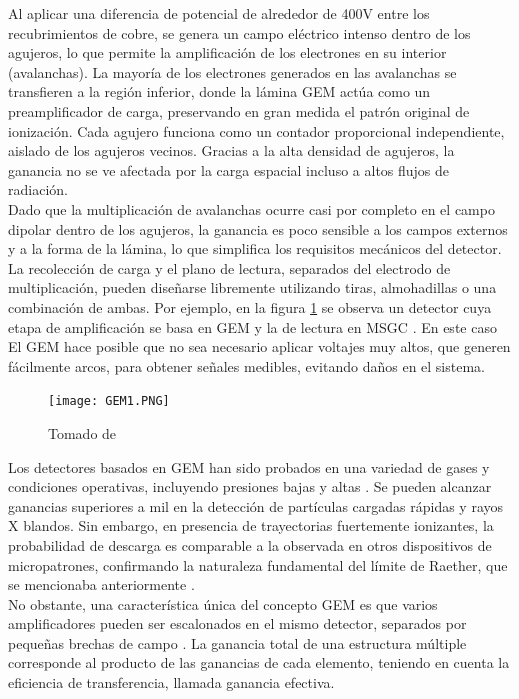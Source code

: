 \documentclass{article}
\begin{document}
\noindent Al aplicar una diferencia de potencial de alrededor de 400V entre los recubrimientos de cobre, se genera un campo eléctrico intenso dentro de los agujeros, lo que permite la amplificación de los electrones en su interior (avalanchas). La mayoría de los electrones generados en las avalanchas se transfieren a la región inferior, donde la lámina GEM actúa como un preamplificador de carga, preservando en gran medida el patrón original de ionización. Cada agujero funciona como un contador proporcional independiente, aislado de los agujeros vecinos. Gracias a la alta densidad de agujeros, la ganancia no se ve afectada por la carga espacial incluso a altos flujos de radiación.\\ 

\noindent Dado que la multiplicación de avalanchas ocurre casi por completo en el campo dipolar dentro de los agujeros, la ganancia es poco sensible a los campos externos y a la forma de la lámina, lo que simplifica los requisitos mecánicos del detector. La recolección de carga y el plano de lectura, separados del electrodo de multiplicación, pueden diseñarse libremente utilizando tiras, almohadillas o una combinación de ambas. Por ejemplo, en la figura \ref{fig:gem_MSGC} se observa un detector cuya etapa de amplificación se basa en GEM y la de lectura en MSGC \cite{zeuner2000msgc}. En este caso El GEM hace posible que no sea necesario aplicar voltajes muy altos, que generen fácilmente arcos, para obtener señales medibles, evitando daños en el sistema. 

\begin{figure}[H]
    \centering
    \texttt{[image: GEM1.PNG]}
    \caption{Tomado de \cite{zeuner2000msgc}}
    \label{fig:gem_MSGC}
\end{figure}

\noindent Los detectores basados en GEM han sido probados en una variedad de gases y condiciones operativas, incluyendo presiones bajas y altas \cite{sauli2014gas}. Se pueden alcanzar ganancias superiores a mil en la detección de partículas cargadas rápidas y rayos X blandos. Sin embargo, en presencia de trayectorias fuertemente ionizantes, la probabilidad de descarga es comparable a la observada en otros dispositivos de micropatrones, confirmando la naturaleza fundamental del límite de Raether, que se mencionaba anteriormente \cite{bachmann1999charge}.\\

\noindent No obstante, una característica única del concepto GEM es que varios amplificadores pueden ser escalonados en el mismo detector, separados por pequeñas brechas de campo \cite{bouclier1997gas} \cite{benlloch1998further}. La ganancia total de una estructura múltiple corresponde al producto de las ganancias de cada elemento, teniendo en cuenta la eficiencia de transferencia, llamada ganancia efectiva.\\
\end{document}
